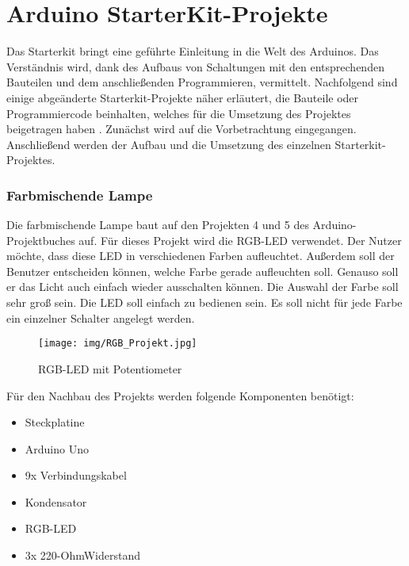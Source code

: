 \section{Arduino StarterKit-Projekte}


Das Starterkit bringt eine geführte Einleitung in die Welt des Arduinos. Das Verständnis wird, dank des Aufbaus von
Schaltungen mit den entsprechenden Bauteilen und dem anschließenden Programmieren,
vermittelt. Nachfolgend sind einige abgeänderte Starterkit-Projekte näher erläutert, die Bauteile oder Programmiercode beinhalten, welches für die Umsetzung des Projektes beigetragen haben . Zunächst wird auf die Vorbetrachtung eingegangen. Anschließend werden der Aufbau und die Umsetzung des einzelnen Starterkit-Projektes.




\subsubsection{Farbmischende Lampe}

Die farbmischende Lampe baut auf den Projekten 4 und 5 des Arduino-Projektbuches auf. Für dieses Projekt wird die RGB-LED verwendet. Der Nutzer möchte, dass diese LED in verschiedenen Farben aufleuchtet. Außerdem soll der Benutzer entscheiden können, welche Farbe gerade aufleuchten soll. Genauso soll er das Licht auch einfach wieder ausschalten können. Die Auswahl der Farbe soll sehr groß sein. Die LED soll einfach zu bedienen sein. Es soll nicht für jede Farbe ein einzelner Schalter angelegt werden.


\begin{figure}[h]
\begin{center}
\texttt{[image: img/RGB\_Projekt.jpg]}
\caption{RGB-LED mit Potentiometer}
\label{rgb_project}
\end{center}
\end{figure}

Für den Nachbau des Projekts werden folgende Komponenten benötigt:
\begin{itemize}
\item{Steckplatine}
\item{Arduino Uno}
\item{9x Verbindungskabel}
\item{Kondensator}
\item{RGB-LED}
\item{3x 220-OhmWiderstand}
\end{itemize}

